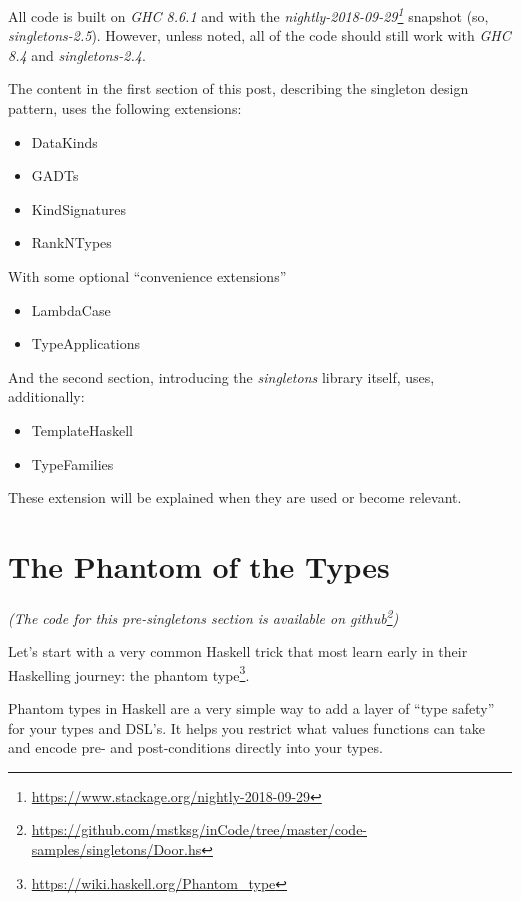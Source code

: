 \documentclass[]{article}
\renewcommand{\href}[2]{#2\footnote{\url{#1}}}
\begin{document}
All code is built on \emph{GHC 8.6.1} and with the
\emph{\href{https://www.stackage.org/nightly-2018-09-29}{nightly-2018-09-29}}
snapshot (so, \emph{singletons-2.5}). However, unless noted, all of the code
should still work with \emph{GHC 8.4} and \emph{singletons-2.4}.

The content in the first section of this post, describing the singleton design
pattern, uses the following extensions:

\begin{itemize}
\tightlist
\item
  DataKinds
\item
  GADTs
\item
  KindSignatures
\item
  RankNTypes
\end{itemize}

With some optional ``convenience extensions''

\begin{itemize}
\tightlist
\item
  LambdaCase
\item
  TypeApplications
\end{itemize}

And the second section, introducing the \emph{singletons} library itself, uses,
additionally:

\begin{itemize}
\tightlist
\item
  TemplateHaskell
\item
  TypeFamilies
\end{itemize}

These extension will be explained when they are used or become relevant.

\hypertarget{the-phantom-of-the-types}{%
\section{The Phantom of the Types}\label{the-phantom-of-the-types}}

\emph{(The code for this pre-singletons section is available
\href{https://github.com/mstksg/inCode/tree/master/code-samples/singletons/Door.hs}{on
github})}

Let's start with a very common Haskell trick that most learn early in their
Haskelling journey: the \href{https://wiki.haskell.org/Phantom_type}{phantom
type}.

Phantom types in Haskell are a very simple way to add a layer of ``type safety''
for your types and DSL's. It helps you restrict what values functions can take
and encode pre- and post-conditions directly into your types.
\end{document}
